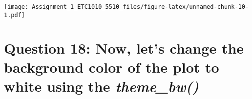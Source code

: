 \documentclass[
]{article}
\newenvironment{Shaded}{\begin{snugshade}}{\end{snugshade}}
\newcommand{\CommentTok}[1]{\textcolor[rgb]{0.56,0.35,0.01}{\textit{#1}}}
\newcommand{\DataTypeTok}[1]{\textcolor[rgb]{0.13,0.29,0.53}{#1}}
\newcommand{\KeywordTok}[1]{\textcolor[rgb]{0.13,0.29,0.53}{\textbf{#1}}}
\newcommand{\NormalTok}[1]{#1}
\newcommand{\OperatorTok}[1]{\textcolor[rgb]{0.81,0.36,0.00}{\textbf{#1}}}
\newcommand{\StringTok}[1]{\textcolor[rgb]{0.31,0.60,0.02}{#1}}
\begin{document}
\begin{Shaded}
\end{Shaded}

\texttt{[image: Assignment\_1\_ETC1010\_5510\_files/figure-latex/unnamed-chunk-10-1.pdf]}

\hypertarget{question-18-now-lets-change-the-background-color-of-the-plot-to-white-using-the-theme_bw}{%
\section{\texorpdfstring{Question 18: Now, let's change the background
color of the plot to white using the
\emph{theme\_bw()}}{Question 18: Now, let's change the background color of the plot to white using the theme\_bw()}}\label{question-18-now-lets-change-the-background-color-of-the-plot-to-white-using-the-theme_bw}}
\end{document}
